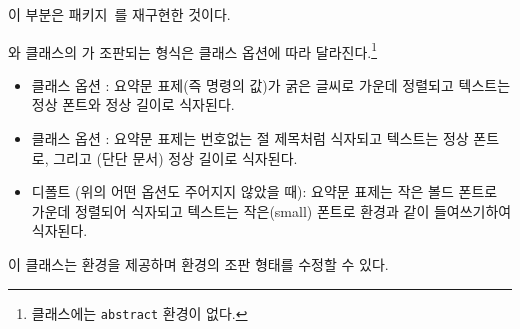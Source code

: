 
이 부분은  패키지~\cite{ABSTRACT}를 재구현한 것이다.

%
와  클래스의 가 조판되는
형식은 클래스 옵션에 따라 달라진다.\footnote{ 클래스에는 \texttt{abstract} 환경이 없다.}

\begin{itemize}
\item 클래스 옵션 : 요약문 표제(즉 \cmd{\abstractname} 명령의 값)가 
굵은 글씨로 가운데 정렬되고 텍스트는 정상 폰트와 정상 길이로 식자된다.
\item 클래스 옵션 : 요약문 표제는 번호없는 절 제목처럼
식자되고 텍스트는 정상 폰트로, 그리고 (단단 문서) 정상 길이로 식자된다.
\item 디폴트 (위의 어떤 옵션도 주어지지 않았을 때): 요약문 표제는 작은 볼드 폰트로 가운데 정렬되어 식자되고 텍스트는 작은(small) 폰트로  환경과
같이 들여쓰기하여 식자된다.
\end{itemize}

%
이 클래스는  환경을 제공하며
 환경의 조판 형태를 수정할 수 있다. 

